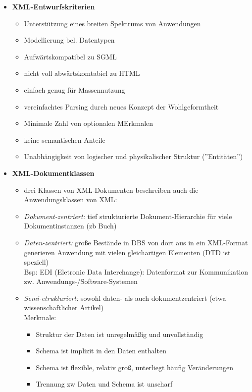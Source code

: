 \begin{itemize}
	\item \textbf{XML-Entwurfskriterien}
	\begin{itemize}
		\item Unterstützung eines breiten Spektrums von Anwendungen
		\item Modellierung bel. Datentypen
		\item Aufwärtskompatibel zu SGML
		\item nicht voll abwärtskomtabiel zu HTML
		\item einfach genug für Massennutzung
		\item vereinfachtes Parsing durch neues Konzept der Wohlgeformtheit
		\item Minimale Zahl von optionalen MErkmalen
		\item keine semantischen Anteile
		\item Unabhängigkeit von logischer und physikalischer Struktur (''Entitäten'') 
	\end{itemize}
	
	\item \textbf{XML-Dokumentklassen}
	\begin{itemize}
		\item drei Klassen von XML-Dokumenten beschreiben auch die Anwendungsklassen von XML:
		\item \textit{Dokument-zentriert:} tief strukturierte Dokument-Hierarchie für viele Dokumentinstanzen (zb Buch)
		\item \textit{Daten-zentriert:} große Bestände in DBS von dort aus in ein XML-Format generieren Anwendung mit vielen gleichartigen Elementen (DTD ist speziell)\\
		Bsp: EDI (Eletronic Data Interchange): Datenformat zur Kommunikation zw. Anwendungs-/Software-Systemen
		\item \textit{Semi-etrukturiert:} sowohl daten- als auch dokumentzentriert (etwa wissenschaftlicher Artikel)\\
		Merkmale:
		\begin{itemize}
			\item Struktur der Daten ist unregelmäßig und unvollständig
			\item Schema ist implizit in den Daten enthalten
			\item Schema ist flexible, relativ groß, unterliegt häufig Veränderungen
			\item Trennung zw Daten und Schema ist unscharf
		\end{itemize}
	\end{itemize}
	

\end{itemize}
